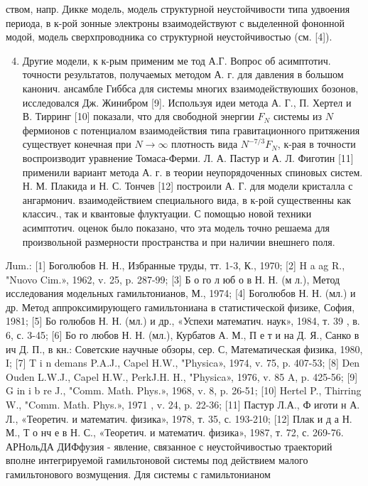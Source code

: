 \documentclass[10pt]{article}
\begin{document}
ством, напр. Дикке модель, модель структурной неустойчивости типа удвоения периода, в к-рой зонные электроны взаимодействуют с выделенной фононной модой, модель сверхпроводника со структурной неустойчивостью (см. [4]).



\begin{enumerate}

  \setcounter{enumi}{3}

  \item Другие модели, к к-рым применим ме тод А.Г. Вопрос об асимптотич. точности результатов, получаемых методом А. г. для давления в большом канонич. ансамбле Гиббса для системы многих взаимодействуюших бозонов, исследовался Дж. Жинибром [9]. Используя идеи метода А. Г., П. Хертел и В. Тирринг [10] показали, что для свободной энергии $F_{N}$ системы из $N$ фермионов с потенциалом взаимодействия типа гравитационного притяжения существует конечная при $N \rightarrow \infty$ плотность вида $N^{-7 / 3} F_{N}$, к-рая в точности воспроизводит уравнение Томаса-Ферми. Л. А. Пастур и А. Л. Фиготин [11] применили вариант метода А. г. в теории неупорядоченных спиновых систем. Н. М. Плакида и Н. С. Тончев [12] построили А. Г. для модели кристалла с ангармонич. взаимодействием специального вида, в к-рой существенны как классич., так и квантовые флуктуации. С помощью новой техники асимптотич. оценок было показано, что эта модель точно решаема для произвольной размерности пространства и при наличии внешнего поля.

\end{enumerate}



Лum.: [1] Боголюбов Н. Н., Избранные труды, тт. 1-3, К., 1970; [2] H a ag R., "Nuovo Cim.», 1962, v. 25, p. 287-99; [3] Б о го л юб о в Н. Н. (м л.), Метод исследования модельных гамильтонианов, М., 1974; [4] Боголюбов Н. Н. (мл.) и др. Метод аппроксимирующего гамильтониана в статистической физике, София, 1981; [5] Бо голюбов Н. Н. (мл.) и др., «Успехи математич. наук», 1984, т. 39 , в. 6, с. 3-45; [6] Бо го любов Н. Н. (мл.), Курбатов А. М., П е т и на Д. Я., Санко в ич Д. П., в кн.: Советские научные обзоры, сер. С, Математическая физика, 1980, I; [7] T i n demans P.A.J., Capel H.W., "Physica», 1974, v. 75, p. 407-53; [8] Den Ouden L.W.J., Capel H.W., PerkJ.H. H., "Physica», 1976, v. 85 A, p. 425-56; [9] G in i b re J., "Comm. Math. Phys.», 1968, v. 8, p. 26-51; [10] Hertel P., Thirring W., "Comm. Math. Phys.», 1971 , v. 24, p. 22-36; [11] Пастур Л.А., Ф иготи н А. Л., «Теоретич. и математич. физика», 1978, т. 35, с. 193-210; [12] Плак и д а Н. М., Т о нч е в Н. С., «Теоретич. и математич. физика», 1987, т. 72, с. 269-76. АРНольДА ДИФфузия - явление, связанное с неустойчивостью траекторий вполне интегрируемой гамильтоновой системы под действием малого гамильтонового возмущения. Для системы с гамильтонианом
\end{document}
